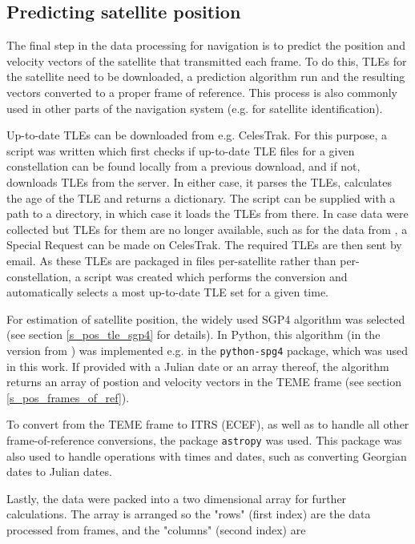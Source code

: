 \subsection{Predicting satellite position}
The final step in the data processing for navigation is to predict the position and velocity vectors of the satellite that transmitted each frame. To do this, TLEs for the satellite need to be downloaded, a prediction algorithm run and the resulting vectors converted to a proper frame of reference. This process is also commonly used in other parts of the navigation system (e.g. for satellite identification).

Up-to-date TLEs can be downloaded from e.g. CelesTrak\cite{des11}. For this purpose, a script was written which first checks if up-to-date TLE files for a given constellation can be found locally from a previous download, and if not, downloads TLEs from the server. In either case, it parses the TLEs, calculates the age of the TLE and returns a dictionary. The script can be supplied with a path to a directory, in which case it loads the TLEs from there. In case data were collected but TLEs for them are no longer available, such as for the data from \cite{sat08}, a Special Request can be made on CelesTrak. The required TLEs are then sent by email. As these TLEs are packaged in files per-satellite rather than per-constellation, a  script was created which performs the conversion and automatically selects a most up-to-date TLE set for a given time.

For estimation of satellite position, the widely used SGP4 algorithm was selected (see section \ref{s_pos_tle_sgp4} for details). In Python, this algorithm (in the version from \cite{pos06}) was implemented e.g. in the \texttt{python-spg4} package\cite{des12}, which was used in this work. If provided with a Julian date or an array thereof, the algorithm returns an array of postion and velocity vectors in the TEME frame (see section \ref{s_pos_frames_of_ref}).

To convert from the TEME frame to ITRS (ECEF), as well as to handle all other frame-of-reference conversions, the package \texttt{astropy}\cite{des13} was used. This package was also used to handle operations with times and dates, such as converting Georgian dates to Julian dates.

Lastly, the data were packed into a two dimensional array for further calculations. The array is arranged so the "rows" (first index) are the data processed from frames, and the "columns" (second index) are

